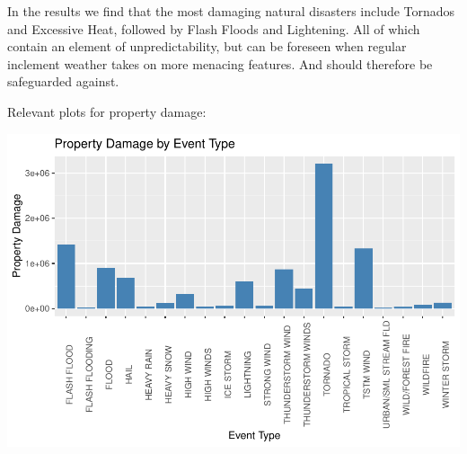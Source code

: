 \documentclass[]{article}
\newenvironment{Shaded}{\begin{snugshade}}{\end{snugshade}}
\newcommand{\KeywordTok}[1]{\textcolor[rgb]{0.13,0.29,0.53}{\textbf{#1}}}
\newcommand{\DataTypeTok}[1]{\textcolor[rgb]{0.13,0.29,0.53}{#1}}
\newcommand{\DecValTok}[1]{\textcolor[rgb]{0.00,0.00,0.81}{#1}}
\newcommand{\StringTok}[1]{\textcolor[rgb]{0.31,0.60,0.02}{#1}}
\newcommand{\CommentTok}[1]{\textcolor[rgb]{0.56,0.35,0.01}{\textit{#1}}}
\newcommand{\OperatorTok}[1]{\textcolor[rgb]{0.81,0.36,0.00}{\textbf{#1}}}
\newcommand{\NormalTok}[1]{#1}
\begin{document}
In the results we find that the most damaging natural disasters include
Tornados and Excessive Heat, followed by Flash Floods and Lightening.
All of which contain an element of unpredictability, but can be foreseen
when regular inclement weather takes on more menacing features. And
should therefore be safeguarded against.

Relevant plots for property damage:

\begin{Shaded}
\end{Shaded}

\includegraphics{Project2_files/figure-latex/plots econ-1.pdf}
\end{document}
